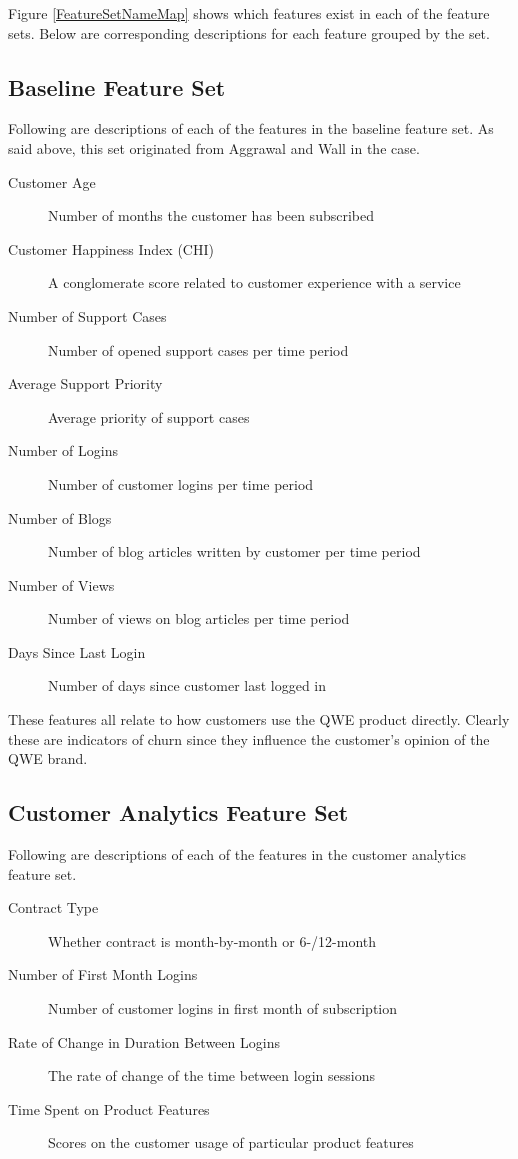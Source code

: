\documentclass{article}
\begin{document}
	Figure \ref{FeatureSetNameMap} shows which features exist in each of the feature sets. Below are corresponding descriptions for each feature grouped by the set. 
	
	\subsection{Baseline Feature Set}
	
	Following are descriptions of each of the features in the baseline feature set. As said above, this set originated from Aggrawal and Wall in the case.
	
	\begin{description}
		\item[Customer Age] Number of months the customer has been subscribed
		\item[Customer Happiness Index (CHI)] A conglomerate score related to customer experience with a service
		\item[Number of Support Cases] Number of opened support cases per time period
		\item[Average Support Priority] Average priority of support cases
		\item[Number of Logins] Number of customer logins per time period
		\item[Number of Blogs] Number of blog articles written by customer per time period
		\item[Number of Views] Number of views on blog articles per time period
		\item[Days Since Last Login] Number of days since customer last logged in  
	\end{description}

	These features all relate to how customers use the QWE product directly. Clearly these are indicators of churn since they influence the customer's opinion of the QWE brand.

	\subsection{Customer Analytics Feature Set}
	
	Following are descriptions of each of the features in the customer analytics feature set.
	
	\begin{description}
		\item[Contract Type] Whether contract is month-by-month or 6-/12-month
		\item[Number of First Month Logins] Number of customer logins in first month of subscription
		\item[Rate of Change in Duration Between Logins] The rate of change of the time between login sessions
		\item[Time Spent on Product Features] Scores on the customer usage of particular product features 
	\end{description}
\end{document}
